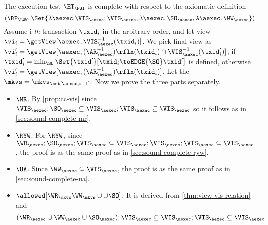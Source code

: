 The execution test $\ET_\PSI$ is complete with respect to the axiomatic definition 
\[ (\RP_{\LWW}, \Set{\lambda \aexec.  \VIS_\aexec ; \VIS_{\aexec}, \lambda \aexec \ldotp \SO_\aexec , \lambda \aexec \ldotp \WW_\aexec })\]
Assume i-\emph{th} transaction \( \txid_i \) in the arbitrary order,
and let view \( \vi_{i} = \getView[\aexec, \VIS^{-1}_{\aexec}(\txid_{i})] \).
We pick final view as \( \vi'_{i} = \getView[\aexec, (\AR^{-1}_{\aexec})\rflx(\txid_{i}) \cap \VIS_{\aexec}^{-1}(\txid'_i)] \),
if \( \txid'_i = \min_{\SO}\Set{\txid'}[\txid_i \toEDGE{\SO} \txid' ]\) is defined,
otherwise  \( \vi'_{i} = \getView[\aexec, (\AR^{-1}_{\aexec})\rflx(\txid_{i})]\).
Let the \( \mkvs = \mkvs_{\cut[\aexec, i-1]} \).
Now we prove the three parts separately.
\begin{itemize}
    \item \( \MR \).  By \cref{prop:cc-vis} since 
    \( \VIS_\aexec ; \SO_\aexec \subseteq \VIS_\aexec ; \VIS_\aexec \subseteq \VIS_\aexec \)
    so it follows as in \cref{sec:sound-complete-mr}.
    \item \( \RYW \). For \( \RYW \), since \( \WR_\aexec ; \SO_\aexec ; \VIS_\aexec \subseteq \VIS_\aexec ; \VIS_\aexec ; \VIS_\aexec \subseteq \VIS_\aexec\), 
    the proof is as the same proof as in \cref{sec:sound-complete-ryw}.
    \item \( \UA \). Since \( \WW_\aexec \subseteq \VIS_\aexec\), 
    the proof is as the same proof as in \cref{sec:sound-complete-ua}.
    \item \( \allowed[\WR_\mkvs \WW_\mkvs \cup \cup \SO]\). It is derived from \cref{thm:view-vis-relation} and 
        \[ (\WR_\aexec \cup \WW_\aexec \cup \SO_\aexec) ; \VIS_\aexec \subseteq \VIS_\aexec ; \VIS_\aexec \subseteq \VIS_\aexec\]
\end{itemize}
